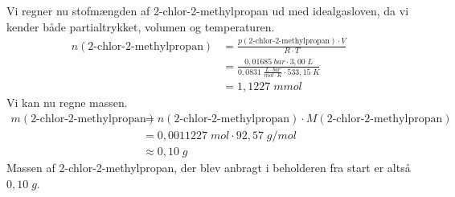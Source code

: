 \documentclass{report}
\begin{document}
Vi regner nu stofmængden af 2-chlor-2-methylpropan ud med idealgasloven, da vi kender både partialtrykket, volumen og temperaturen.
\begin{equation*}
\begin{split}
  n(\text{2-chlor-2-methylpropan})&=\frac{p(\text{2-chlor-2-methylpropan}) \cdot V}{R \cdot T}\\
  &=\frac{0,01685 \;\unit{bar} \cdot 3,00 \;\unit{L} }{0,0831 \;\unit{\frac{L \cdot bar}{mol \cdot K}} \cdot 533,15 \;\unit{K} }\\
  &=1,1227 \;\unit{mmol} 
\end{split}
\end{equation*}
Vi kan nu regne massen.
\begin{equation*}
\begin{split}
  m(\text{2-chlor-2-methylpropan} )&=n(\text{2-chlor-2-methylpropan} )\cdot M(\text{2-chlor-2-methylpropan})\\
  &=0,0011227 \;\unit{mol} \cdot 92,57 \;\unit{g/mol} \\
  &\approx 0,10 \;\unit{g} 
\end{split}
\end{equation*}
Massen af 2-chlor-2-methylpropan, der blev anbragt i beholderen fra start er altså $0,10 \;\unit{g} $.
\end{document}
